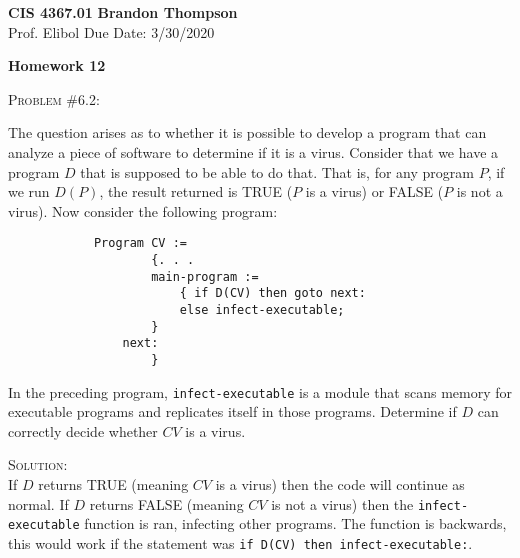 \documentclass[12pt]{article}
\newenvironment{problem}[1]
{\begin{mdframed}[linewidth=0.8pt]
        \textsc{Problem #1:}

}
    {\end{mdframed}}
\newenvironment{solution}
    {\textsc{Solution:}\\}
    {\newpage}%
\begin{document}
\noindent
\textbf{CIS 4367.01} \hfill \textbf{Brandon Thompson} \\
\normalsize Prof. Elibol \hfill Due Date: 3/30/2020 \\

\begin{center}
\textbf{Homework 12}
\end{center}
	\begin{problem}{\#6.2}
		The question arises as to whether it is possible to develop a program that can analyze a piece of software to determine if it is a virus. Consider that we have a program $D$ that is supposed to be able to do that. That is, for any program $P$, if we run $D\left( P \right) $, the result returned is TRUE ($P$ is a virus) or FALSE ($P$ is not a virus). Now consider the following program:
		\begin{verbatim}
			Program CV :=
			    	{. . .
			    	main-program :=
			    		{ if D(CV) then goto next:
						else infect-executable;
					}
				next:
		    		}
		\end{verbatim}
		In the preceding program, \verb|infect-executable| is a module that scans memory for executable programs and replicates itself in those programs. Determine if $D$ can correctly decide whether $CV$ is a virus.
	\end{problem}
	\begin{solution}
		If $D$ returns TRUE (meaning $CV$ is a virus) then the code will continue as normal. If $D$ returns FALSE (meaning $CV$ is not a virus) then the \verb|infect-executable| function is ran, infecting other programs. The function is backwards, this would work if the statement was \verb|if D(CV) then infect-executable:|.
	\end{solution}
\end{document}
